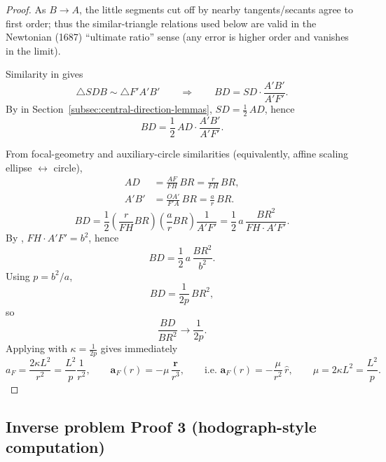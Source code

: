 \begin{proof}
As $B\to A$, the little segments cut off by nearby tangents/secants agree to first order; thus the similar-triangle relations used below are valid in the Newtonian (1687) ``ultimate ratio'' sense (any error is higher order and vanishes in the limit).

Similarity in  gives
\begin{equation}
  \triangle SDB \sim \triangle F'\!A'B'
  \qquad\Longrightarrow\qquad
  BD=SD\cdot\frac{A'B'}{A'F'}.
\end{equation}
By  in Section~\ref{subsec:central-direction-lemmas}, $SD=\frac12\,AD$, hence
\begin{equation}
  BD=\frac12\,AD\cdot\frac{A'B'}{A'F'}.
\end{equation}

From focal-geometry and auxiliary-circle similarities (equivalently, affine scaling ellipse $\leftrightarrow$ circle),
\begin{equation}
  \begin{aligned}
    AD&=\frac{AF}{FH}\,BR=\frac{r}{FH}\,BR,\\
    A'B'&=\frac{OA'}{F'\!A}\,BR=\frac{a}{r}\,BR.
  \end{aligned}
\end{equation}
\begin{equation}
  BD=\frac12\left(\frac{r}{FH}BR\right)\left(\frac{a}{r}BR\right)\frac{1}{A'F'}
  =\frac12\,a\,\frac{BR^2}{FH\cdot A'F'}.
\end{equation}
By , $FH\cdot A'F'=b^2$, hence
\begin{equation}
  BD=\frac12\,a\,\frac{BR^2}{b^2}.
\end{equation}
Using $p=b^2/a$,
\begin{equation}
  BD=\frac{1}{2p}\,BR^2,
  \label{eq:proof2-bd-br2}
\end{equation}
so
\[
  \frac{BD}{BR^2}\to \frac{1}{2p}.
\]
Applying  with $\kappa=\frac{1}{2p}$ gives immediately
\[
  a_F=\frac{2\kappa L^2}{r^2}=\frac{L^2}{p}\frac{1}{r^2},
  \qquad
  \mathbf a_F(r)=-\mu\,\frac{\mathbf r}{r^3},
  \qquad
  \text{i.e. }\mathbf a_F(r)=-\frac{\mu}{r^2}\,\hat r,
  \qquad
  \mu=2\kappa L^2=\frac{L^2}{p}.
\]
\end{proof}

\subsection{Inverse problem Proof 3 (hodograph-style computation)}
\label{subsec:proof3-hodograph}

